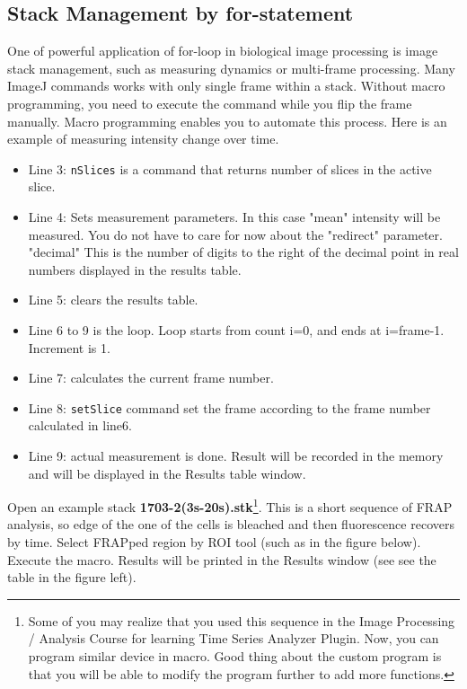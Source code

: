 \documentclass[11pt,a4paper,oneside]{report}
\newcommand{\ilcom}[1]{\texttt{\small#1}}
\begin{document}
\subsection{Stack Management by for-statement}
One of powerful application of for-loop in biological image processing is image stack management, such as measuring dynamics or multi-frame processing. Many ImageJ commands works with only single frame within a stack. Without macro programming, you need to execute the command while you flip the frame manually. Macro programming enables you to automate this process. Here is an example of measuring intensity change over time. 

\begin{itemize}
\item Line 3: \ilcom{nSlices} is a command that returns number of slices in the active slice. 

\item Line 4: Sets measurement parameters. In this case "mean" intensity will be measured. You do not have to care for now about the "redirect" parameter. "decimal" This is the number of digits to the right of the decimal point in real numbers displayed in the results table. 

\item Line 5: clears the results table. 

\item Line 6 to 9 is the loop. Loop starts from count i=0, and ends at i=frame-1. Increment is 1.  

\item Line 7: calculates the current frame number. 

\item Line 8: \ilcom{setSlice} command set the frame according to the frame number calculated in line6. 

\item Line 9:  actual measurement is done. Result will be recorded in the memory and will be displayed in the Results table window. 
\end{itemize}

Open an example stack \textbf{1703-2(3s-20s).stk}\footnote{Some of you may realize that you used this sequence in the Image Processing / Analysis Course for learning Time Series Analyzer Plugin. Now, you can program similar device in macro. Good thing about the custom program is that you will be able to modify the program further to add more functions.}. This is a short sequence of FRAP analysis, so edge of the one of the cells is bleached and then fluorescence recovers by time. Select FRAPped region by ROI tool (such as in the figure below). Execute the macro. Results will be printed in the Results window (see see the table in the figure left). 
\end{document}
